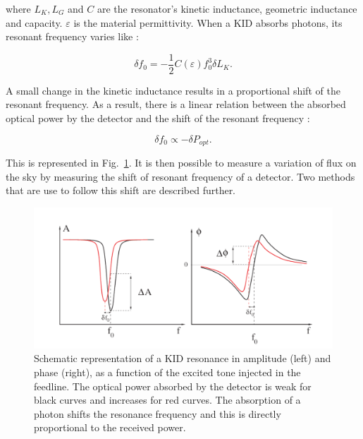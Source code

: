 where $L_{K}, L_{G}$ and $C$ are the resonator's kinetic inductance, geometric inductance and capacity. $\varepsilon$ is the material permittivity.
When a KID absorbs photons, its resonant frequency varies like :

\begin{equation}
\delta f_{0} = -\frac{1}{2}C(\varepsilon)f_{0}^{3} \delta L_{K}.
\end{equation}

A small change in the kinetic inductance results in a proportional shift of the resonant frequency. As a result, there is a linear relation between the absorbed optical power by the detector and the shift of the resonant frequency :

\begin{equation}
\delta f_{0} \propto -\delta P_{opt}.
\end{equation}

This is represented in Fig.~\ref{fig:resonance}. It is then possible to measure a variation of flux on the sky by measuring the shift of resonant frequency of a detector. Two methods that are use to follow this shift are described further.

\begin{figure}
  \includegraphics[clip, angle=0, width=\columnwidth]{Figures/resonance.png}
  \caption{Schematic representation of a KID resonance in amplitude (left) and phase (right), as a function of the excited tone injected in the feedline. The optical power absorbed by the detector is weak for black curves and increases for red curves. The absorption of a photon shifts the resonance frequency and this is directly proportional to the received power.}
  \label{fig:resonance}
\end{figure}


